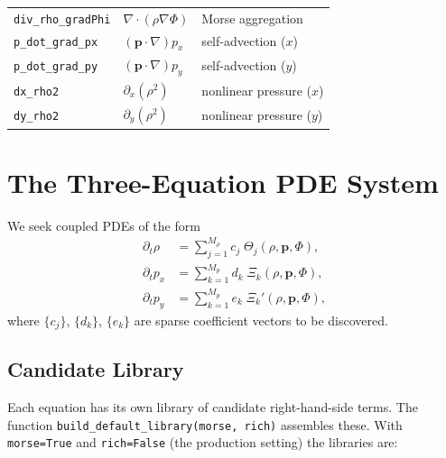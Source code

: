 \documentclass[11pt, letterpaper]{article}
\theoremstyle{definition}
\newcommand{\vp}{\mathbf{p}}
\newcommand{\divop}{\nabla\!\cdot}
\newcommand{\grad}{\nabla}
\begin{document}
\begin{center}
\begin{tabular}{lll}
  \texttt{div\_rho\_gradPhi} & $\divop(\rho\grad\Phi)$                  & Morse aggregation \\
  \texttt{p\_dot\_grad\_px}  & $(\vp \cdot \grad)p_x$                   & self-advection ($x$) \\
  \texttt{p\_dot\_grad\_py}  & $(\vp \cdot \grad)p_y$                   & self-advection ($y$) \\
  \texttt{dx\_rho2}        & $\partial_x(\rho^{2})$                     & nonlinear pressure ($x$) \\
  \texttt{dy\_rho2}        & $\partial_y(\rho^{2})$                     & nonlinear pressure ($y$) \\
  \bottomrule
\end{tabular}
\end{center}

\section{The Three-Equation PDE System}
\label{sec:pde-system}

We seek coupled PDEs of the form
\begin{equation}
\label{eq:3field-pde}
\boxed{
\begin{aligned}
  \partial_t \rho   &= \sum_{j=1}^{M_{\rho}} c_j \;\Theta_j(\rho, \vp, \Phi), \\[4pt]
  \partial_t p_x    &= \sum_{k=1}^{M_{p}} d_k \;\Xi_k(\rho, \vp, \Phi), \\[4pt]
  \partial_t p_y    &= \sum_{k=1}^{M_{p}} e_k \;\Xi_k'(\rho, \vp, \Phi),
\end{aligned}}
\end{equation}
where $\{c_j\}$, $\{d_k\}$, $\{e_k\}$ are sparse coefficient
vectors to be discovered.

\subsection{Candidate Library}
\label{sec:library}

Each equation has its own library of candidate right-hand-side terms.
The function \texttt{build\_default\_library(morse, rich)} assembles
these.  With \texttt{morse=True} and \texttt{rich=False} (the
production setting) the libraries are:
\end{document}
